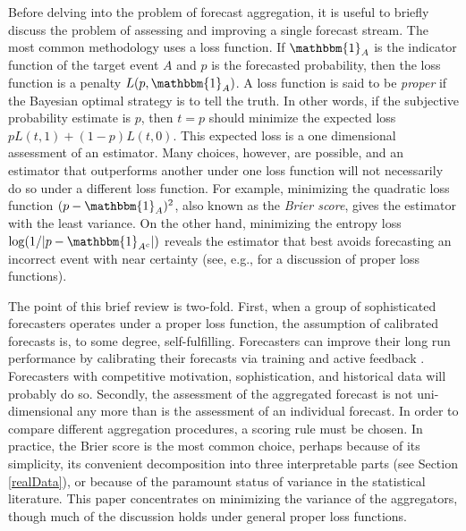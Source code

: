 \documentclass[12pt]{article}
\theoremstyle{definition}
\theoremstyle{definition}
\def\one{\mathbbm{1}}
\begin{document}
Before delving into the problem of forecast aggregation, it is useful
to briefly discuss the problem of assessing and improving a single
forecast stream.  The most common methodology uses a loss
function. If $\one_A$ is the indicator function of the target event
$A$ and $p$ is the forecasted probability, then the loss function is a penalty $L(p , \one_A)$.  A loss function is said to
be {\em proper} if the Bayesian optimal strategy is
to tell the truth.  In other words, if the subjective probability
estimate is $p$, then $t = p$ should minimize the expected loss $p
L(t,1) + (1-p) L(t,0)$.  This expected loss is a one dimensional
assessment of an estimator. Many choices, however, are possible, and
an estimator that outperforms another under one loss function will not
necessarily do so under a different loss function.  For example,
minimizing the quadratic loss function $(p - \one_A)^2$, also known as
the {\em Brier score}, gives the estimator with the least variance. On
the other hand, minimizing the entropy loss $\log (1 / |p -
\one_{A^c}|)$ reveals the estimator that best avoids forecasting an
incorrect event with near certainty (see, e.g., \citealt{HwPe1997}
for a discussion of proper loss functions).

The point of this brief review is two-fold.  First, when a group of
sophisticated forecasters operates under a proper loss function,
the assumption of calibrated forecasts is, to some degree,
self-fulfilling.  Forecasters can improve their long run performance
by calibrating their forecasts via training and active
feedback \citep{o2006uncertain}. Forecasters with competitive
motivation, sophistication, and historical data will probably do so. Secondly, the
assessment of the aggregated forecast is not uni-dimensional any more
than is the assessment of an individual forecast.  In order to compare
different aggregation procedures, a scoring rule must be chosen.  In
practice, the Brier score is the most common choice, perhaps because
of its simplicity, its convenient decomposition into three
interpretable parts (see Section \ref{realData}), or because of the
paramount status of variance in the statistical literature. This paper concentrates on minimizing the variance of the aggregators, though
 much of the discussion holds under general proper loss
functions.
\end{document}

